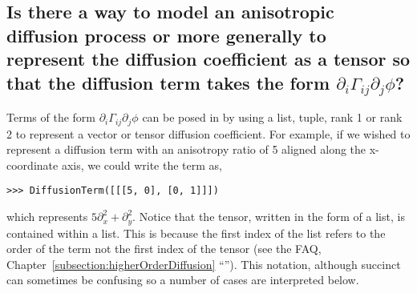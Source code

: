           \subsection{Is there a way to model an anisotropic diffusion
            process or more generally to represent the diffusion
            coefficient as a tensor so that the diffusion term takes the
            form $\partial_i \Gamma_{ij}\partial_j \phi$?}
          Terms of the form $\partial_i \Gamma_{ij}\partial_j \phi$ can
          be posed in \FiPy{} by using a list, tuple, rank 1 or rank 2
           to represent a vector or tensor diffusion
          coefficient.  For example, if we wished to represent a
          diffusion term with an anisotropy ratio of 5 aligned along the
          x-coordinate axis, we could write the term as,
\begin{verbatim}
>>> DiffusionTerm([[[5, 0], [0, 1]]])
\end{verbatim}
          which represents $5 \partial_x^2 + \partial_y^2$.  Notice that
          the tensor, written in the form of a list, is contained within
          a list. This is because the first index of the list refers to
          the order of the term not the first index of the tensor (see
          the FAQ, Chapter~\ref{subsection:higherOrderDiffusion}
          ``''). This
          notation, although succinct can sometimes be confusing so a
          number of cases are interpreted below.
